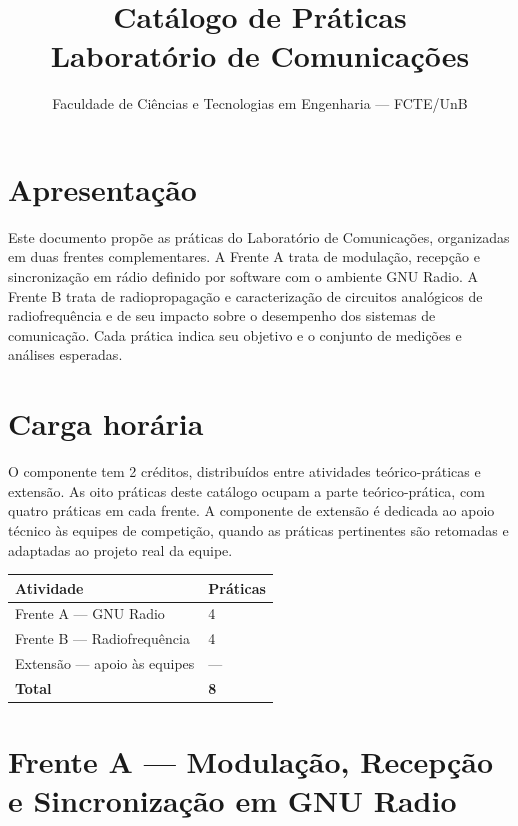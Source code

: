 \documentclass[11pt,a4paper]{article}
\title{\textbf{Catálogo de Práticas}\\[0.3em]\large Laboratório de Comunicações}
\author{Faculdade de Ciências e Tecnologias em Engenharia --- FCTE/UnB}
\date{}
\begin{document}
\thispagestyle{plain}
\maketitle
\vspace{-1.0em}

\section{Apresentação}

Este documento propõe as práticas do Laboratório de Comunicações, organizadas em duas frentes complementares. A Frente A trata de modulação, recepção e sincronização em rádio definido por software com o ambiente GNU Radio. A Frente B trata de radiopropagação e caracterização de circuitos analógicos de radiofrequência e de seu impacto sobre o desempenho dos sistemas de comunicação. Cada prática indica seu objetivo e o conjunto de medições e análises esperadas.

\section{Carga horária}

O componente tem 2 créditos, distribuídos entre atividades teórico-práticas e extensão. As oito práticas deste catálogo ocupam a parte teórico-prática, com quatro práticas em cada frente. A componente de extensão é dedicada ao apoio técnico às equipes de competição, quando as práticas pertinentes são retomadas e adaptadas ao projeto real da equipe.

\begin{center}
\small
\begin{tabular}{@{}p{} p{}@{}}
\toprule
\textbf{Atividade} & \textbf{Práticas} \\
\midrule
Frente A --- GNU Radio & 4 \\
Frente B --- Radiofrequência & 4 \\
Extensão --- apoio às equipes & --- \\
\midrule
\textbf{Total} & \textbf{8} \\
\bottomrule
\end{tabular}
\end{center}

\section{Frente A --- Modulação, Recepção e Sincronização em GNU Radio}
\end{document}
